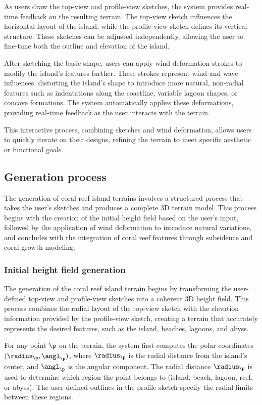 As users draw the top-view and profile-view sketches, the system provides real-time feedback on the resulting terrain. The top-view sketch influences the horizontal layout of the island, while the profile-view sketch defines its vertical structure. These sketches can be adjusted independently, allowing the user to fine-tune both the outline and elevation of the island.

After sketching the basic shape, users can apply wind deformation strokes to modify the island's features further. These strokes represent wind and wave influences, distorting the island's shape to introduce more natural, non-radial features such as indentations along the coastline, variable lagoon shapes, or concave formations. The system automatically applies these deformations, providing real-time feedback as the user interacts with the terrain.

This interactive process, combining sketches and wind deformation, allows users to quickly iterate on their designs, refining the terrain to meet specific aesthetic or functional goals.




\subsection{Generation process}
The generation of coral reef island terrains involves a structured process that takes the user's sketches and produces a complete 3D terrain model. This process begins with the creation of the initial height field based on the user's input, followed by the application of wind deformation to introduce natural variations, and concludes with the integration of coral reef features through subsidence and coral growth modeling.

\subsubsection{Initial height field generation}
The generation of the coral reef island terrain begins by transforming the user-defined top-view and profile-view sketches into a coherent 3D height field. This process combines the radial layout of the top-view sketch with the elevation information provided by the profile-view sketch, creating a terrain that accurately represents the desired features, such as the island, beaches, lagoons, and abyss.

For any point $\p$ on the terrain, the system first computes the polar coordinates $(\radius_\p, \angl_\p)$, where $\radius_\p$ is the radial distance from the island's center, and $\angl_\p$ is the angular component. The radial distance $\radius_\p$ is used to determine which region the point belongs to (island, beach, lagoon, reef, or abyss). The user-defined outlines in the profile sketch specify the radial limits between these regions.


